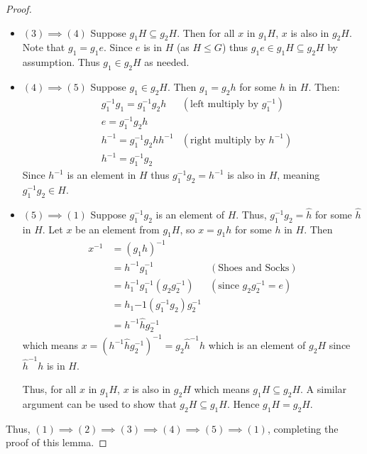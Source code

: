 \begin{proof}
\begin{itemize}
        \item $\boxed{(3) \implies (4)}$
        Suppose $g_1H \subseteq g_2H$. Then for all $x$ in $g_1H$, $x$ is also in $g_2H$. Note that $g_1 = g_1e$. Since $e$ is in $H$ (as $H \leq G$) thus $g_1e \in g_1H \subseteq g_2H$ by assumption. Thus $g_1 \in g_2H$ as needed.

        \item $\boxed{(4) \implies (5)}$
        Suppose $g_1 \in g_2H$. Then $g_1 = g_2h$ for some $h$ in $H$. Then:
        \begin{align*}
            &g_1^{-1}g_1 = g_1^{-1}g_2h & (\text{left multiply by } g_1^{-1})\\
            &e = g_1^{-1}g_2h\\
            &h^{-1} = g_1^{-1}g_2hh^{-1} & (\text{right multiply by } h^{-1})\\
            &h^{-1} = g_1^{-1}g_2
        \end{align*}
        Since $h^{-1}$ is an element in $H$ thus $g_1^{-1}g_2 = h^{-1}$ is also in $H$, meaning $g_1^{-1}g_2 \in H$.

        \item $\boxed{(5) \implies (1)}$
        Suppose $g_1^{-1}g_2$ is an element of $H$. Thus, $g_1^{-1}g_2 = \hat{h}$ for some $\hat{h}$ in $H$. Let $x$ be an element from $g_1H$, so $x = g_1h$ for some $h$ in $H$. Then
        \begin{align*}
            x^{-1} &= (g_1h)^{-1}\\
            &= h^{-1}g_1^{-1} & (\text{Shoes and Socks})\\
            &= h_1^{-1}g_1^{-1}(g_2g_2^{-1}) & (\text{since }g_2g_2^{-1} = e)\\
            &= h_1{-1}(g_1^{-1}g_2)g_2^{-1}\\
            &= h^{-1}\hat{h}g_2^{-1}
        \end{align*}
        which means $x = \left(h^{-1}\hat{h}g_2^{-1}\right)^{-1} = g_2\hat{h}^{-1}h$ which is an element of $g_2H$ since $\hat{h}^{-1}h$ is in $H$.

        Thus, for all $x$ in $g_1H$, $x$ is also in $g_2H$ which means $g_1H \subseteq g_2H$. A similar argument can be used to show that $g_2H \subseteq g_1H$. Hence $g_1H = g_2H$.
    \end{itemize}

    Thus, $(1) \implies (2) \implies (3) \implies (4) \implies (5) \implies (1)$, completing the proof of this lemma.
\end{proof}

